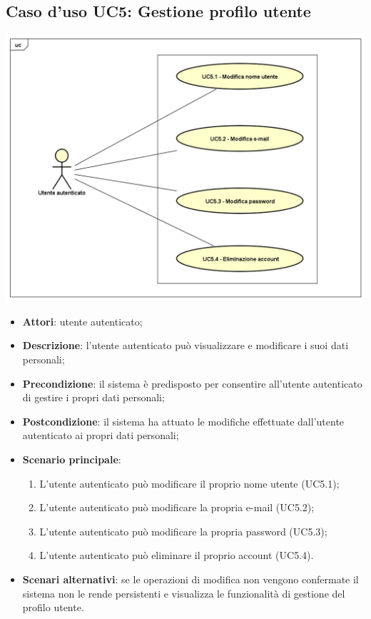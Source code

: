 \subsection{Caso d'uso UC5: Gestione profilo utente}
\begin{center}
	\includegraphics[scale=0.5]{UML/UC5.png}
\end{center}
\begin{itemize}
	\item \textbf{Attori}: utente autenticato;
	\item \textbf{Descrizione}: l'utente autenticato può visualizzare e modificare i suoi dati personali;
	\item \textbf{Precondizione}: il sistema è predisposto per consentire all'utente autenticato di gestire i propri dati personali;
	\item \textbf{Postcondizione}: il sistema ha attuato le modifiche effettuate dall'utente autenticato ai propri dati personali;
	\item \textbf{Scenario principale}:
		\begin{enumerate}
			\item L'utente autenticato può modificare il proprio nome utente (UC5.1);
			\item L'utente autenticato può modificare la propria e-mail (UC5.2);
			\item L'utente autenticato può modificare la propria password (UC5.3);
			\item L'utente autenticato può eliminare il proprio account (UC5.4).
		\end{enumerate} 
	\item \textbf{Scenari alternativi}: se le operazioni di modifica non vengono confermate il sistema non le rende persistenti e visualizza le funzionalità di gestione del profilo utente. 
\end{itemize}

